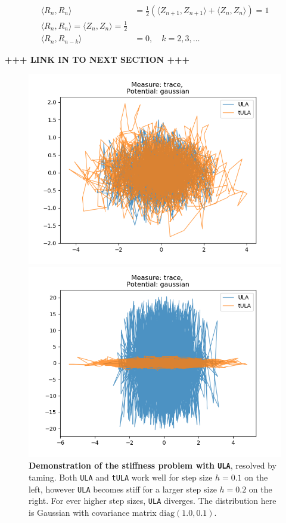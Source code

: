 \begin{align*}
    \langle R_n,R_n\rangle  &= \frac{1}{2} \left( \langle Z_{n+1},Z_{n+1}\rangle +\langle Z_{n},Z_{n}\rangle\right) =1\\
    \langle R_n,R_n\rangle = \langle Z_n,Z_n\rangle = \frac{1}{2}\\
    \langle R_n,R_{n-k} \rangle &= 0,   \quad k=2,3,\dots 
\end{align*}

{\bf +++ LINK IN TO NEXT SECTION +++ }
\begin{figure}[H]
\centering
  \begin{minipage}[b]{0.49\textwidth}
  \centering
    \includegraphics[width=\textwidth]{Figures/ula_tula_step_01.png}
  \end{minipage} %
  \begin{minipage}[b]{0.49\textwidth}
  \centering
    \includegraphics[width=\textwidth]{Figures/ula_tula_step_02.png}
  \end{minipage}
   \caption{\textbf{Demonstration of the stiffness problem with \texttt{ULA}}, resolved by taming. Both \texttt{ULA} and \texttt{tULA} work well for step size $h = 0.1$ on the left, however \texttt{ULA} becomes stiff for a larger step size $h = 0.2$ on the right. For ever higher step sizes, \texttt{ULA} diverges. The distribution here is Gaussian with covariance matrix $\text{diag}(1.0, 0.1)$.}
\end{figure}

